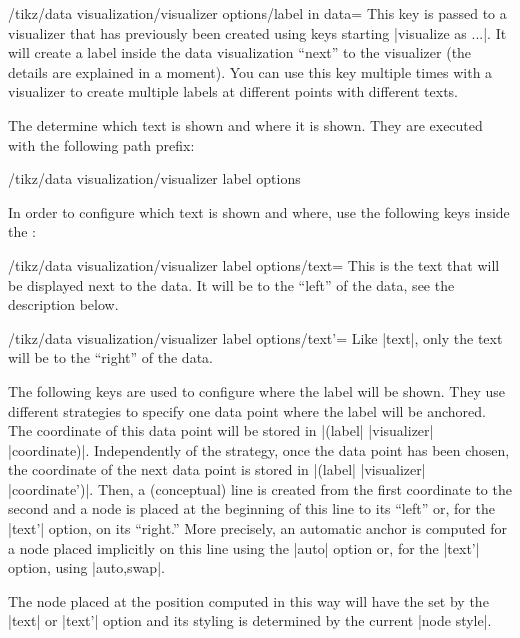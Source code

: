 \begin{key}{/tikz/data visualization/visualizer options/label in data=}
  This key is passed to a visualizer that has previously been created
  using keys starting |visualize as ...|. It will create a label
  inside the data visualization ``next'' to the visualizer (the
  details are explained in a moment). You can use this key multiple
  times with a visualizer to create multiple labels at different
  points with different texts.

  The  determine which text is shown and where it is
  shown. They are executed with the following path prefix:
\begin{codeexample}
/tikz/data visualization/visualizer label options
\end{codeexample}

  In order to configure which text is shown and where, use the
  following keys inside the :
  
  \begin{key}{/tikz/data visualization/visualizer label options/text=}
    This is the text that will be displayed next to the data. It will
    be to the ``left'' of the data, see the description below.
  \end{key}
  \begin{key}{/tikz/data visualization/visualizer label options/text'=}
    Like |text|, only the text will be to the ``right'' of the data.
  \end{key}
  
  The following keys are used to configure where the label will be
  shown. They use different strategies to specify one data point where
  the label will be anchored. The coordinate of this data point will
  be stored in |(label| |visualizer| |coordinate)|. Independently of
  the strategy, once the data point has been chosen, the coordinate of
  the next data point is stored in |(label| |visualizer|
  |coordinate')|. Then, a (conceptual) line is created from the first
  coordinate to the second and a node is placed at the beginning of
  this line to its ``left'' or, for the |text'| option, on its ``right.'' More
  precisely, an automatic anchor is computed for a node placed
  implicitly on this line using the |auto| option or, for the
  |text'| option, using |auto,swap|.

  The node placed at the position computed in this way will have the
   set by the |text| or |text'| option and its styling is
  determined by the current |node style|.
  

\end{key}
